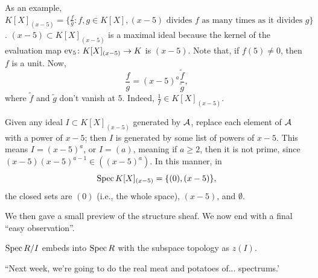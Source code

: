 As an example, $K[X]_{(x - 5)} = \{\frac{f}{g} : f, g \in K[X], (x - 5) \text{ divides $f$ as many times as it divides $g$}\}$. $(x - 5) \subset K[X]_{(x - 5)}$ is a maximal ideal because the kernel of the evaluation map $\operatorname{ev}_5 \colon K[X]_{(x - 5)} \to K$ is $(x - 5)$. Note that, if $f(5) \neq 0$, then $f$ is a unit. Now,
\[ \frac{f}{g} = (x - 5)^a \frac{\tilde f}{\tilde g}, \]
where $\tilde f$ and $\tilde g$ don't vanish at $5$. Indeed, $\frac{1}{f} \in K[X]_{(x - 5)}$.

Given any ideal $I \subset K[X]_{(x - 5)}$ generated by $\mathcal A$, replace each element of $\mathcal A$ with a power of $x - 5$; then $I$ is generated by some list of powers of $x - 5$. This means $I = (x - 5)^a$, or $I = (a)$, meaning if $a \geq 2$, then it is not prime, since $(x - 5) (x - 5)^{a-1} \in ((x - 5)^a)$. In this manner, in
\[ \operatorname{Spec} K[X]_{(x-5)} = \{(0), (x - 5)\}, \]
the closed sets are $(0)$ (i.e., the whole space), $(x - 5)$, and $\emptyset$.

We then gave a small preview of the structure sheaf. We now end with a final ``easy observation''.

\begin{theorem} \label{thm:embed_with_subspace_topology}
    $\operatorname{Spec} R/I$ embeds into $\operatorname{Spec} R$ with the subspace topology as $z(I)$.
\end{theorem}

``Next week, we're going to do the real meat and potatoes of... spectrums.'